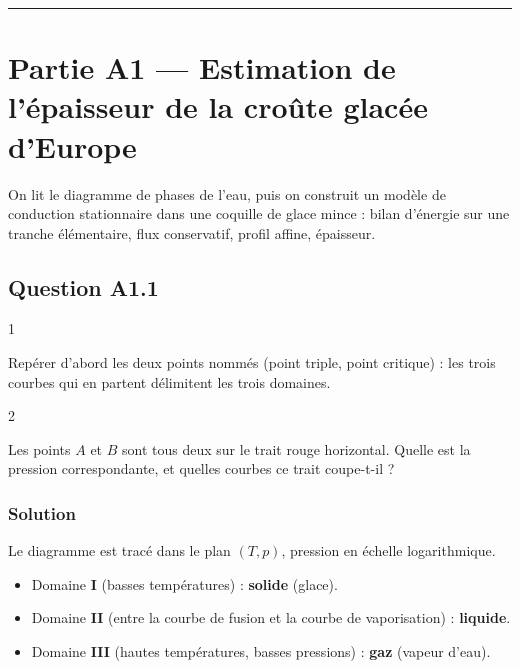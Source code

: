 \documentclass[11pt,a4paper]{article}
\providecommand{\tightlist}{\setlength{\itemsep}{0pt}\setlength{\parskip}{0pt}}
\begin{document}
\begin{center}\rule{0.5\linewidth}{0.5pt}\end{center}

\hypertarget{partie-a1-estimation-de-luxe9paisseur-de-la-crouxfbte-glacuxe9e-deurope}{%
\section{Partie A1 --- Estimation de l'épaisseur de la croûte glacée d'Europe}\label{partie-a1-estimation-de-luxe9paisseur-de-la-crouxfbte-glacuxe9e-deurope}}

On lit le diagramme de phases de l'eau, puis on construit un modèle de conduction stationnaire dans une coquille de glace mince : bilan d'énergie sur une tranche élémentaire, flux conservatif, profil affine, épaisseur.

\hypertarget{question-a1.1}{%
\subsection{Question A1.1}\label{question-a1.1}}

\begin{indication}{1}

Repérer d'abord les deux points nommés (point triple, point critique) : les trois courbes qui en partent délimitent les trois domaines.

\end{indication}

\begin{indication}{2}

Les points \(A\) et \(B\) sont tous deux sur le trait rouge horizontal. Quelle est la pression correspondante, et quelles courbes ce trait coupe-t-il ?

\end{indication}

\hypertarget{solution}{%
\subsubsection{Solution}\label{solution}}

Le diagramme est tracé dans le plan \((T, p)\), pression en échelle logarithmique.

\begin{itemize}
\tightlist
\item
  Domaine \textbf{I} (basses températures) : \textbf{solide} (glace).
\item
  Domaine \textbf{II} (entre la courbe de fusion et la courbe de vaporisation) : \textbf{liquide}.
\item
  Domaine \textbf{III} (hautes températures, basses pressions) : \textbf{gaz} (vapeur d'eau).
\end{itemize}
\end{document}
